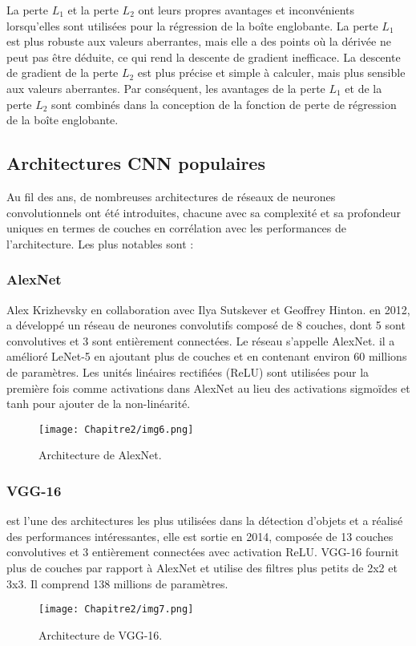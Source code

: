           La perte $L_1$ et la perte $L_2$ ont leurs propres avantages et inconvénients lorsqu'elles sont utilisées pour la régression de la boîte englobante.
          La perte $L_1$ est plus robuste aux valeurs aberrantes, mais elle a des points où la dérivée ne peut pas être déduite, ce qui rend la descente de gradient inefficace.
          La descente de gradient de la perte $L_2$ est plus précise et simple à calculer, mais plus sensible aux valeurs aberrantes.
          Par conséquent, les avantages de la perte $L_1$ et de la perte $L_2$ sont combinés dans la conception de la fonction de perte de régression de la boîte englobante.

     \subsection{Architectures CNN populaires} 
     Au fil des ans, de nombreuses architectures de réseaux de neurones convolutionnels ont été introduites, chacune avec sa complexité et sa profondeur uniques en termes de couches en corrélation avec les performances de l'architecture. Les plus notables sont :
     
          \subsubsection{AlexNet} \cite{alexnet_paper}
          Alex Krizhevsky en collaboration avec Ilya Sutskever et Geoffrey Hinton. en 2012, a développé un réseau de neurones convolutifs composé de 8 couches, dont 5 sont convolutives et 3 sont entièrement connectées. Le réseau s'appelle AlexNet. il a amélioré LeNet-5 en ajoutant plus de couches et en contenant environ 60 millions de paramètres. Les unités linéaires rectifiées (ReLU) sont utilisées pour la première fois comme activations dans AlexNet au lieu des activations sigmoïdes et tanh pour ajouter de la non-linéarité.
          \begin{figure}[H]
               \centering
               \texttt{[image: Chapitre2/img6.png]}
               \caption{Architecture de AlexNet.}
               \label{img6}
               \end{figure}

          \subsubsection{VGG-16} \cite{vgg_paper}
          est l'une des architectures les plus utilisées dans la détection d'objets et a 	réalisé des performances intéressantes, elle est sortie en 2014, composée de 13 couches convolutives et 3 entièrement connectées avec activation ReLU. VGG-16 fournit plus de couches par rapport à AlexNet et utilise des filtres plus petits de 2x2 et 3x3. Il comprend 138 millions de paramètres.
          \begin{figure}[H]
               \centering
               \texttt{[image: Chapitre2/img7.png]}
               \caption{Architecture de VGG-16.}
               \label{img7}
               \end{figure}

